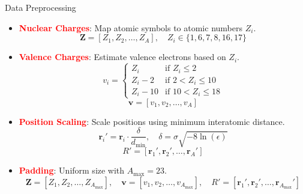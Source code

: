 \documentclass[10pt]{beamer}
\begin{document}
\begin{frame}{Data Preprocessing}
  \begin{itemize}
    \item \textcolor{red}{\textbf{Nuclear Charges}}: Map atomic symbols to atomic numbers \( Z_i \).
      \[
      \mathbf{Z} = [Z_1, Z_2, \ldots, Z_A], \quad Z_i \in \{1, 6, 7, 8, 16, 17\}
      \]
    \item \textcolor{red}{\textbf{Valence Charges}}: Estimate valence electrons based on \( Z_i \).
      \[
      v_i =
      \begin{cases}
        Z_i & \text{if } Z_i \leq 2 \\
        Z_i - 2 & \text{if } 2 < Z_i \leq 10 \\
        Z_i - 10 & \text{if } 10 < Z_i \leq 18
      \end{cases}
      \]
      $$\mathbf{v} = [v_1, v_2, \ldots, v_A]$$
    \item \textcolor{red}{\textbf{Position Scaling}}: Scale positions using minimum interatomic distance.
      \[
      \mathbf{r}_i' = \mathbf{r}_i \cdot \frac{\delta}{d_{\text{min}}}, \quad \delta = \sigma \sqrt{-8 \ln(\epsilon)}
      \]
      $$
      R'= [\mathbf{r}_1', \mathbf{r}_2', \ldots, \mathbf{r}_A']
      $$
    \item \textcolor{red}{\textbf{Padding}}: Uniform size with \( A_{\text{max}} = 23 \).
  $$
  \mathbf{Z} = [Z_1, Z_2, \ldots, Z_{A_{\text{max}}}], \quad
  \mathbf{v} = [v_1, v_2, \ldots, v_{A_{\text{max}}}], \quad
  R' = [\mathbf
{r}_1', \mathbf{r}_2', \ldots, \mathbf{r}_{A_{\text{max}}}']
  $$
  \end{itemize}
\end{frame}
\end{document}
